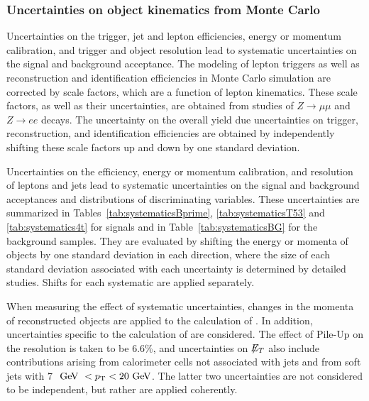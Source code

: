 \subsubsection{Uncertainties on object kinematics from Monte Carlo}
Uncertainties on the trigger, jet and lepton efficiencies, energy or momentum calibration,
and trigger and object resolution lead to systematic uncertainties on the signal and background acceptance.
The modeling of lepton triggers as well as reconstruction and identification efficiencies in
Monte Carlo simulation are corrected by scale factors, which are a function of lepton kinematics.
These scale factors, as well as their uncertainties, are obtained from studies of $Z \rightarrow \mu \mu$ and $Z \rightarrow e e$ decays.
The uncertainty on the overall yield due uncertainties on trigger, reconstruction, and identification efficiencies
are obtained by independently shifting these scale factors up and down by one standard deviation.

Uncertainties on the efficiency, energy or momentum calibration, and resolution of leptons and jets
lead to systematic uncertainties on the signal and background acceptances and distributions of discriminating variables.
These uncertainties are summarized in Tables~\ref{tab:systematicsBprime}, \ref{tab:systematicsT53} and
\ref{tab:systematics4t} for signals and in Table~\ref{tab:systematicsBG} for the background samples.
They are evaluated by shifting the energy or momenta of objects by one standard deviation in each direction,
where the size of each standard deviation associated with each uncertainty is determined by detailed studies.
Shifts for each systematic are applied separately.

When measuring the effect of systematic uncertainties, changes in the momenta of reconstructed objects are applied to the calculation of \met{}.
In addition, uncertainties specific to the calculation of \met{} are considered.
The effect of Pile-Up on the \met{} resolution is taken to be 6.6\%,
and uncertainties on $\not\!\!{E_{T}}{}$ also include contributions arising from calorimeter cells not associated with jets and from soft jets with 7 $\GeV\ < \pt  < 20 \GeV{}$.
The latter two uncertainties are not considered to be independent, but rather are applied coherently.

